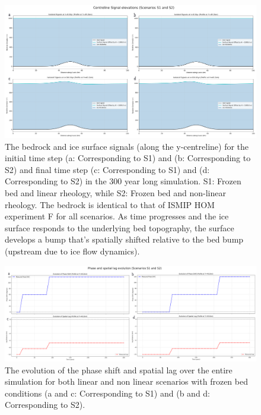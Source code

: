 \begin{figure}[H]
    \includegraphics[scale=0.25]{figures/S1F_S2F_signals.pdf}
    \caption{The bedrock and ice surface signals (along the y-centreline) for the initial time step (a: Corresponding to S1) and (b: Corresponding to S2) and final time step (c: Corresponding to S1) and (d: Corresponding to S2) in the 300 year long simulation. S1: Frozen bed and linear rheology, while S2: Frozen bed and non-linear rheology. The bedrock is identical to that of ISMIP HOM experiment F for all scenarios. As time progresses and the ice surface responds to the underlying bed topography, the surface develops a bump that's spatially shifted relative to the bed bump (upstream due to ice flow dynamics).}
    \label{fig:phase_analysis_Signals_S1S2}
\end{figure}
\begin{figure}[H]
    \includegraphics[scale=0.25]{figures/S1F_S2F_phase-evolution.pdf}
    \caption{The evolution of the phase shift and spatial lag over the entire simulation for both linear and non linear scenarios with frozen bed conditions (a and c: Corresponding to S1) and (b and d: Corresponding to S2).}
    \label{fig:phase_analysis_Evolution_S1S2}
\end{figure}
\newpage
